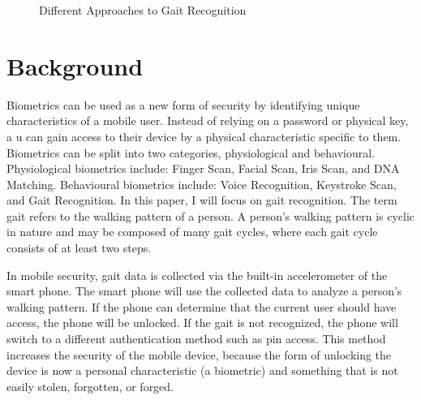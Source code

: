 \documentclass{sig-alternate}
\begin{document}
\begin{figure}
\centering
{}
\caption{Different Approaches to Gait Recognition}
\label{fig:AlgorithmProcess}
\end{figure}	



\section{Background}
	Biometrics can be used as a new form of security by identifying unique characteristics of a mobile user. Instead of relying on a password or physical key, a u can gain access to their device by a physical characteristic specific to them. Biometrics can be split into two categories, physiological and behavioural. Physiological biometrics include: Finger Scan, Facial Scan, Iris Scan, and DNA Matching. Behavioural biometrics include: Voice Recognition, Keystroke Scan, and Gait Recognition. In this paper, I will focus on gait recognition. The term gait refers to the walking pattern of a person. A person's walking pattern is cyclic in nature and may be composed of many gait cycles, where each gait cycle consists of at least two steps.~\cite{Sujithra:2012} 
	
	In mobile security, gait data is collected via the built-in accelerometer of the smart phone. The smart phone will use the collected data to analyze a person's walking pattern. If the phone can determine that the current user should have access, the phone will be unlocked. If the gait is not recognized, the phone will switch to a different authentication method such as pin access. This method increases the security of the mobile device, because the form of unlocking the device is now a personal characteristic (a biometric) and something that is not easily stolen, forgotten, or forged.



\end{document}
